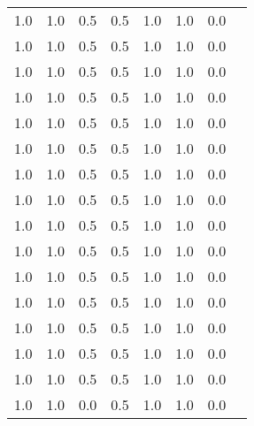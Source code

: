 \begin{tabular}{L{1in}|L{1in}|L{1in}|L{1in}|L{1in}|L{1in}|L{1in}|L{1in}}
1.0&1.0&0.5&0.5&1.0&1.0&0.0\\
1.0&1.0&0.5&0.5&1.0&1.0&0.0\\
1.0&1.0&0.5&0.5&1.0&1.0&0.0\\
1.0&1.0&0.5&0.5&1.0&1.0&0.0\\
1.0&1.0&0.5&0.5&1.0&1.0&0.0\\
1.0&1.0&0.5&0.5&1.0&1.0&0.0\\
1.0&1.0&0.5&0.5&1.0&1.0&0.0\\
1.0&1.0&0.5&0.5&1.0&1.0&0.0\\
1.0&1.0&0.5&0.5&1.0&1.0&0.0\\
1.0&1.0&0.5&0.5&1.0&1.0&0.0\\
1.0&1.0&0.5&0.5&1.0&1.0&0.0\\
1.0&1.0&0.5&0.5&1.0&1.0&0.0\\
1.0&1.0&0.5&0.5&1.0&1.0&0.0\\
1.0&1.0&0.5&0.5&1.0&1.0&0.0\\
1.0&1.0&0.5&0.5&1.0&1.0&0.0\\
1.0&1.0&0.0&0.5&1.0&1.0&0.0\\
\hline\end{tabular}
